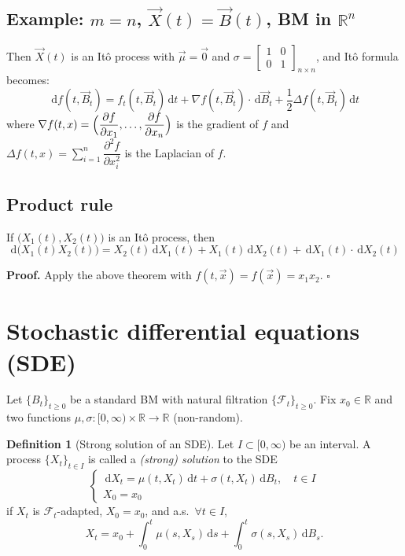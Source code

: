 \documentclass[11pt]{article}
\newcommand{\R}{\mathbb{R}}
\newcommand{\F}{\mathcal{F}}
\newcommand{\dd}{\,\mathrm{d}}
\theoremstyle{definition}
\newtheorem{definition}{Definition}[section]
\theoremstyle{plain}
\begin{document}
\subsection*{Example: $m=n$, $\vec X(t)=\vec B(t)$, BM in $\R^n$}

\noindent Then $\vec X(t)$ is an It\^o process with
$\vec\mu=\vec0$ and
$\sigma=\begin{bmatrix}1&0\\0&1\end{bmatrix}_{n\times n}$, and It\^o formula becomes:
\[
  \dd f(t,\vec B_t)
  =f_t(t,\vec B_t)\dd t+\nabla f(t,\vec B_t)\cdot\dd\vec B_t
  +\frac12\Delta f(t,\vec B_t)\dd t
\]
where
$\nabla f(t,x)=\Bigl(\dfrac{\partial f}{\partial x_1},\ldots,\dfrac{\partial f}{\partial x_n}\Bigr)$
is the gradient of $f$ and
$\Delta f(t,x)=\sum_{i=1}^n\dfrac{\partial^2f}{\partial x_i^2}$
is the Laplacian of $f$.

\subsection*{Product rule}

\noindent If $\bigl(X_1(t),X_2(t)\bigr)$ is an It\^o process, then
\[
  \dd\bigl(X_1(t)X_2(t)\bigr)
  =X_2(t)\dd X_1(t)+X_1(t)\dd X_2(t)+\dd X_1(t)\cdot\dd X_2(t)
\]

\noindent\textbf{Proof.} Apply the above theorem with
$f(t,\vec x)=f(\vec x)=x_1x_2$. \hfill$\square$

\section{Stochastic differential equations (SDE)}

Let $\{B_t\}_{t\ge0}$ be a standard BM with natural filtration $\{\F_t\}_{t\ge0}$.
Fix $x_0\in\R$ and two functions $\mu,\sigma:[0,\infty)\times\R\to\R$ (non-random).

\begin{definition}[Strong solution of an SDE]
Let $I\subset[0,\infty)$ be an interval. A process $\{X_t\}_{t\in I}$ is called a
\emph{(strong) solution} to the SDE
\[
  \begin{cases}
    \dd X_t=\mu(t,X_t)\dd t+\sigma(t,X_t)\dd B_t, \quad t\in I\\[2pt]
    X_0=x_0
  \end{cases}
\]
if $X_t$ is $\F_t$-adapted, $X_0=x_0$, and a.s.\ $\forall t\in I$,
\[
  X_t=x_0+\int_0^t\mu(s,X_s)\dd s+\int_0^t\sigma(s,X_s)\dd B_s .
\]
\end{definition}
\end{document}
